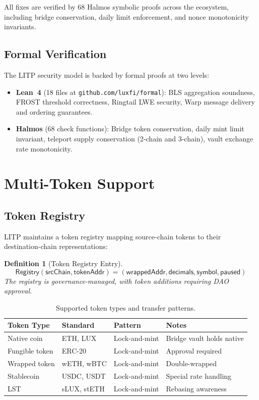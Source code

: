 \documentclass[11pt,a4paper]{article}
\newtheorem{definition}{Definition}
\begin{document}
All fixes are verified by 68 Halmos symbolic proofs across the ecosystem, including bridge conservation, daily limit enforcement, and nonce monotonicity invariants.

\subsection{Formal Verification}

The LITP security model is backed by formal proofs at two levels:

\begin{itemize}
    \item \textbf{Lean~4} (18 files at \texttt{github.com/luxfi/formal}): BLS aggregation soundness, FROST threshold correctness, Ringtail LWE security, Warp message delivery and ordering guarantees.
    \item \textbf{Halmos} (68 check functions): Bridge token conservation, daily mint limit invariant, teleport supply conservation (2-chain and 3-chain), vault exchange rate monotonicity.
\end{itemize}

\section{Multi-Token Support}\label{sec:multitoken}

\subsection{Token Registry}

LITP maintains a token registry mapping source-chain tokens to their destination-chain representations:

\begin{definition}[Token Registry Entry]
\begin{equation}
    \mathsf{Registry}(\mathsf{srcChain}, \mathsf{tokenAddr}) = (\mathsf{wrappedAddr}, \mathsf{decimals}, \mathsf{symbol}, \mathsf{paused})
\end{equation}
The registry is governance-managed, with token additions requiring DAO approval.
\end{definition}

\begin{table}[H]
\centering
\caption{Supported token types and transfer patterns.}
\label{tab:tokentypes}
\begin{tabular}{llll}
\toprule
\textbf{Token Type} & \textbf{Standard} & \textbf{Pattern} & \textbf{Notes} \\
\midrule
Native coin & ETH, LUX & Lock-and-mint & Bridge vault holds native \\
Fungible token & ERC-20 & Lock-and-mint & Approval required \\
Wrapped token & wETH, wBTC & Lock-and-mint & Double-wrapped \\
Stablecoin & USDC, USDT & Lock-and-mint & Special rate handling \\
LST & sLUX, stETH & Lock-and-mint & Rebasing awareness \\
\bottomrule
\end{tabular}
\end{table}
\end{document}
